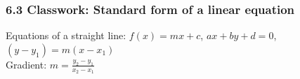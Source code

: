 

\fancyhead[LE]{\thepage}



\subsubsection*{6.3 Classwork: Standard form of a linear equation}
Equations of a straight line: $f(x)=mx+c$, $ax+by+d=0$, $(y-y_1)=m(x-x_1)$\\[0.25cm]
Gradient: $\displaystyle m=\frac{y_2-y_1}{x_2-x_1}$ \vspace{1cm}
